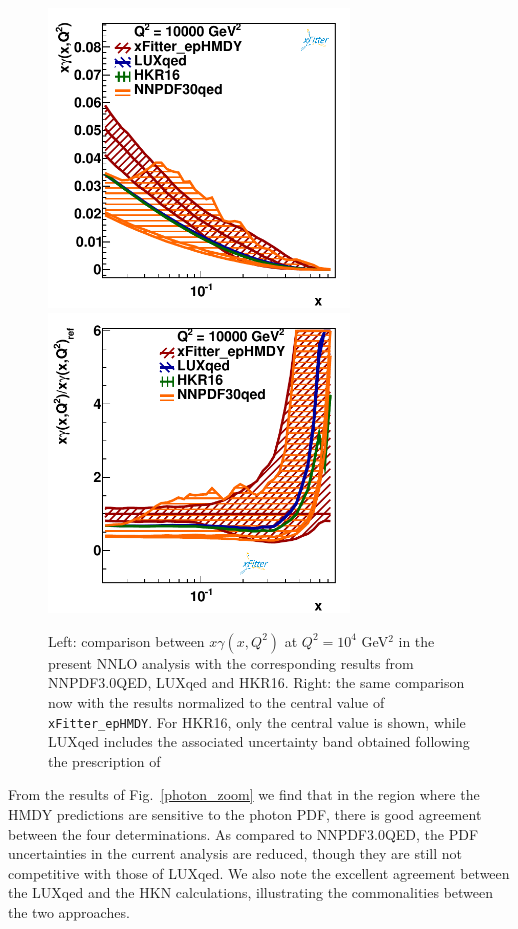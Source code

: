 \begin{figure}[t]
  \includegraphics[width=8cm]{figs/photon_comp_10000.pdf}
  \includegraphics[width=8cm]{figs/photon_comp_10000_ratio.pdf} 
\caption{Left: comparison between $x\gamma(x,Q^2)$ at $Q^2=10^4$ GeV$^2$ in the present
  NNLO analysis with the corresponding results from NNPDF3.0QED, LUXqed and HKR16.
  Right: the same comparison now with the results normalized to the central value
  of {\tt xFitter\_epHMDY}.
  For HKR16, only the central value is shown, while LUXqed includes
  the associated uncertainty band obtained following the prescription
  of~\cite{Manohar:2016nzj} }
\label{photon_zoom} \label{photon_zoom_ratio}
\end{figure}

From the results of Fig.~\ref{photon_zoom} we find that in the region
where the HMDY predictions are sensitive to the photon PDF, there is
good agreement between the four determinations.
%
As compared to NNPDF3.0QED, the PDF uncertainties in the current
analysis are reduced, though they are still not competitive with those
of LUXqed.
%
We also note the excellent agreement between the LUXqed and the HKN
calculations, illustrating the commonalities between the two
approaches.

